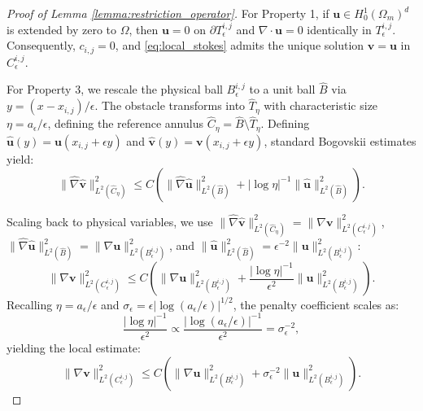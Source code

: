 \documentclass{elsarticle}
\begin{document}
\begin{proof}[Proof of Lemma \ref{lemma:restriction_operator}]
    For Property 1, if $\mathbf{u} \in H_0^1(\Omega_m)^d$ is extended by zero to $\Omega$, then $\mathbf{u} = 0$ on $\partial T_{\epsilon}^{i,j}$ and $\nabla \cdot \mathbf{u} = 0$ identically in $T_{\epsilon}^{i,j}$. Consequently, $c_{i,j} = 0$, and \eqref{eq:local_stokes} admits the unique solution $\mathbf{v} = \mathbf{u}$ in $C_{\epsilon}^{i,j}$.

    For Property 3, we rescale the physical ball $B_{\epsilon}^{i,j}$ to a unit ball $\hat{B}$ via $y = (x - x_{i,j})/\epsilon$. The obstacle transforms into $\hat{T}_{\eta}$ with characteristic size $\eta = a_{\epsilon}/\epsilon$, defining the reference annulus $\hat{C}_{\eta} = \hat{B} \setminus \hat{T}_{\eta}$. Defining $\hat{\mathbf{u}}(y) = \mathbf{u}(x_{i,j} + \epsilon y)$ and $\hat{\mathbf{v}}(y) = \mathbf{v}(x_{i,j} + \epsilon y)$, standard Bogovskii estimates \cite[Lemma 2.2.5]{Allaire1991} yield:
    \begin{equation}
        \|\hat{\nabla} \hat{\mathbf{v}}\|_{L^2(\hat{C}_{\eta})}^2 \le C \left( \|\hat{\nabla} \hat{\mathbf{u}}\|_{L^2(\hat{B})}^2 + |\log \eta|^{-1} \|\hat{\mathbf{u}}\|_{L^2(\hat{B})}^2 \right).
    \end{equation}

    Scaling back to physical variables, we use $\|\hat{\nabla} \hat{\mathbf{v}}\|_{L^2(\hat{C}_{\eta})}^2 = \|\nabla \mathbf{v}\|_{L^2(C_{\epsilon}^{i,j})}^2$, $\|\hat{\nabla} \hat{\mathbf{u}}\|_{L^2(\hat{B})}^2 = \|\nabla \mathbf{u}\|_{L^2(B_{\epsilon}^{i,j})}^2$, and $\|\hat{\mathbf{u}}\|_{L^2(\hat{B})}^2 = \epsilon^{-2} \|\mathbf{u}\|_{L^2(B_{\epsilon}^{i,j})}^2$:
    \begin{equation}
        \|\nabla \mathbf{v}\|_{L^2(C_{\epsilon}^{i,j})}^2 \le C \left( \|\nabla \mathbf{u}\|_{L^2(B_{\epsilon}^{i,j})}^2 + \frac{|\log \eta|^{-1}}{\epsilon^2} \|\mathbf{u}\|_{L^2(B_{\epsilon}^{i,j})}^2 \right).
    \end{equation}
    Recalling $\eta = a_{\epsilon}/\epsilon$ and $\sigma_{\epsilon} = \epsilon |\log(a_{\epsilon}/\epsilon)|^{1/2}$, the penalty coefficient scales as:
    \begin{equation}
        \frac{|\log \eta|^{-1}}{\epsilon^2} \propto \frac{|\log(a_{\epsilon}/\epsilon)|^{-1}}{\epsilon^2} = \sigma_{\epsilon}^{-2},
    \end{equation}
    yielding the local estimate:
    \begin{equation}
        \|\nabla \mathbf{v}\|_{L^2(C_{\epsilon}^{i,j})}^2 \le C \left( \|\nabla \mathbf{u}\|_{L^2(B_{\epsilon}^{i,j})}^2 + \sigma_{\epsilon}^{-2} \|\mathbf{u}\|_{L^2(B_{\epsilon}^{i,j})}^2 \right).
    \end{equation}


\end{proof}
\end{document}
